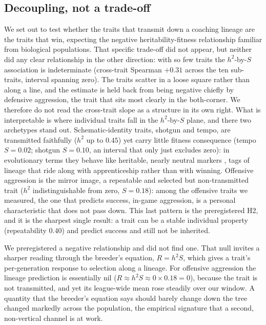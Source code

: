 \documentclass[
  journal=ehs,
  manuscript=article,
  year=2026,
  volume=8,
]{cup-journal}
\begin{document}
\subsection{Decoupling, not a trade-off}
We set out to test whether the traits that transmit down a coaching lineage are the
traits that win, expecting the negative heritability-fitness relationship familiar
from biological populations. That specific trade-off did not appear, but neither
did any clear relationship in the other direction: with so few traits the
$h^{2}$-by-$S$ association is indeterminate (cross-trait Spearman $+0.31$ across the
ten sub-traits, interval spanning zero). The traits scatter in a loose square rather
than along a line, and the estimate is held back from being negative chiefly by
defensive aggression, the trait that sits most clearly in the both-corner. We therefore do
not read the cross-trait slope as a structure in its own right. What is interpretable
is where individual traits fall in the $h^{2}$-by-$S$ plane, and there two archetypes
stand out. Schematic-identity traits,
shotgun and tempo, are transmitted faithfully ($h^{2}$ up to $0.45$) yet carry little
fitness consequence (tempo $S=0.02$; shotgun $S=0.10$, an interval that only just
excludes zero): in evolutionary terms they behave like heritable, nearly neutral
markers \parencite{kimura1968}, tags of lineage
that ride along with apprenticeship rather than with winning. Offensive aggression
is the mirror image, a repeatable and selected but non-transmitted trait ($h^{2}$
indistinguishable from zero, $S=0.18$): among the offensive traits we measured, the
one that predicts success, in-game aggression, is a personal characteristic that
does not pass down. This last pattern is the preregistered H2,
and it is the sharpest single result: a trait can be a stable individual property
(repeatability $0.40$) and predict success and still not be inherited.

We preregistered a negative relationship and did not find one. That null invites a
sharper reading through the breeder's equation, $R=h^{2}S$, which gives a trait's
per-generation response to selection along a lineage. For offensive aggression the
lineage prediction is essentially nil ($R\approx h^{2}S\approx 0\times 0.18=0$),
because the trait is not transmitted, and yet its league-wide mean rose steadily
over our window. A quantity that the breeder's equation says should barely change
down the tree changed markedly across the population, the empirical signature that a
second, non-vertical channel is at work.
\end{document}
